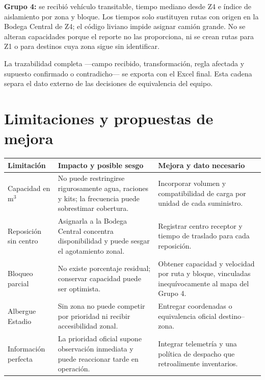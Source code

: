 \documentclass[11pt,letterpaper]{article}
\begin{document}
\textbf{Grupo 4:} se recibió vehículo transitable, tiempo mediano desde Z4 e
índice de aislamiento por zona y bloque. Los tiempos solo sustituyen rutas con
origen en la Bodega Central de Z4; el código liviano impide asignar camión
grande. No se alteran capacidades porque el reporte no las proporciona, ni se
crean rutas para Z1 o para destinos cuya zona sigue sin identificar.

\begin{center}
\end{center}

La trazabilidad completa ---campo recibido, transformación, regla afectada y
supuesto confirmado o contradicho--- se exporta con el Excel final. Esta cadena
separa el dato externo de las decisiones de equivalencia del equipo.

\section{Limitaciones y propuestas de mejora}

\begin{tabularx}{\linewidth}{@{}p{.19\linewidth}X X@{}}
\toprule
\textbf{Limitación} & \textbf{Impacto y posible sesgo} & \textbf{Mejora y dato necesario}\\
\midrule
Capacidad en m$^3$ & No puede restringirse rigurosamente agua, raciones y kits; la frecuencia puede sobrestimar cobertura. & Incorporar volumen y compatibilidad de carga por unidad de cada suministro.\\
Reposición sin centro & Asignarla a la Bodega Central concentra disponibilidad y puede sesgar el agotamiento zonal. & Registrar centro receptor y tiempo de traslado para cada reposición.\\
Bloqueo parcial & No existe porcentaje residual; conservar capacidad puede ser optimista. & Obtener capacidad y velocidad por ruta y bloque, vinculadas inequívocamente al mapa del Grupo 4.\\
Albergue Estadio & Sin zona no puede competir por prioridad ni recibir accesibilidad zonal. & Entregar coordenadas o equivalencia oficial destino--zona.\\
Información perfecta & La prioridad oficial supone observación inmediata y puede reaccionar tarde en operación. & Integrar telemetría y una política de despacho que retroalimente inventarios.\\
\bottomrule
\end{tabularx}
\end{document}
